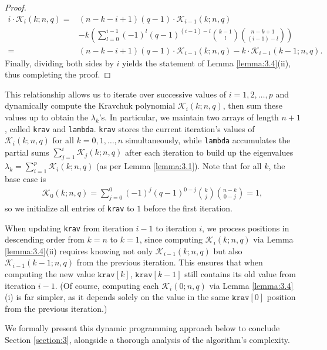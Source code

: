 \documentclass{article}
\def\K{\mathcal{K}}
\numberwithin{equation}{section}
\theoremstyle{plain}
\begin{document}
\begin{proof}
    \begin{align*}
        i \cdot \K_i(k; n, q) ={} & (n - k - i + 1)(q - 1) \cdot \K_{i - 1}(k; n, q) \\
        & - k{\left(\sum_{l = 0}^{i - 1} (-1)^l (q - 1)^{(i - 1) - l} \binom{k - 1}{l} \binom{n - k + 1}{(i - 1) - l}\right)} \\
        ={} & (n - k - i + 1)(q - 1) \cdot \K_{i - 1}(k; n, q) - k \cdot \K_{i - 1}({k - 1}; n, q).
    \end{align*}
    Finally, dividing both sides by $i$ yields the statement of Lemma \ref{lemma:3.4}(ii), thus completing the proof.
\end{proof}

This relationship allows us to iterate over successive values of $i = 1, 2, \ldots, p$ and dynamically compute the Kravchuk polynomial $\K_i(k; n, q)$, then sum these values up to obtain the $\lambda_k$'s. In particular, we maintain two arrays of length $n + 1$, called \texttt{krav} and \texttt{lambda}. \texttt{krav} stores the current iteration's values of $\K_i(k; n, q)$ for all $k = 0, 1, \ldots, n$ simultaneously, while \texttt{lambda} accumulates the partial sums $\sum_{j = 1}^i \K_j(k; n, q)$ after each iteration to build up the eigenvalues $\lambda_k = \sum_{i = 1}^p \K_i(k; n, q)$ (as per Lemma \ref{lemma:3.1}). Note that for all $k$, the base case is
\begin{align*}
     \K_0(k; n, q) = \sum_{j = 0}^0 (-1)^j (q - 1)^{0 - j} \binom{k}{j} \binom{n - k}{0 - j} = 1,
\end{align*}
so we initialize all entries of \texttt{krav} to $1$ before the first iteration.

When updating \texttt{krav} from iteration $i - 1$ to iteration $i$, we process positions in descending order from $k = n$ to $k = 1$, since computing $\K_i(k; n, q)$ via Lemma \ref{lemma:3.4}(ii) requires knowing not only $\K_{i - 1}(k; n, q)$ but also $\K_{i - 1}(k - 1; n, q)$ from the previous iteration. This ensures that when computing the new value $\texttt{krav}[k]$, $\texttt{krav}[k - 1]$ still contains its old value from iteration $i - 1$. (Of course, computing each $\K_i(0; n, q)$ via Lemma \ref{lemma:3.4}(i) is far simpler, as it depends solely on the value in the same $\texttt{krav}[0]$ position from the previous iteration.)

We formally present this dynamic programming approach below to conclude Section \ref{section:3}, alongside a thorough analysis of the algorithm's complexity.
\end{document}
